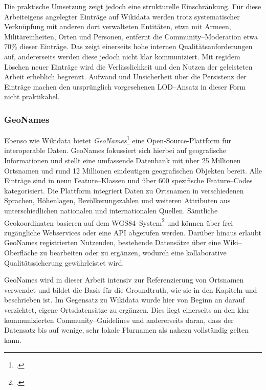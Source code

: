 \documentclass[12pt, a4paper, ngerman, bidi=default]{article}
\let\cite\footcite
\begin{document}
Die praktische Umsetzung zeigt jedoch eine strukturelle Einschränkung. Für diese Arbeiteigens angelegter Einträge auf Wikidata werden
trotz systematischer Verknüpfung mit anderen dort verwalteten Entitäten, etwa mit Armeen, Militäreinheiten, Orten und Personen, entfernt die Community–Moderation etwa 70\% dieser Einträge. 
Das zeigt einerseits hohe internen Qualitätsanforderungen auf, andererseits werden diese jedoch nicht klar kommuniziert. Mit regidem Löschen neuer Einträge wird die Verlässlichkeit und den Nutzen der 
geleisteten Arbeit erheblich begrenzt. 
Aufwand und Unsicherheit über die Persistenz der Einträge machen den ursprünglich vorgesehenen LOD–Ansatz in dieser Form nicht praktikabel.

\subsubsection{GeoNames}\label{subsubsec:geonames}

Ebenso wie Wikidata bietet \textit{GeoNames}\cite[vgl.][]{noauthor_geonames_nodate} eine Open-Source-Plattform für interoperable Daten. GeoNames fokussiert sich hierbei auf geografische Informationen 
und stellt eine umfassende Datenbank mit über 25 Millionen Ortsnamen und rund 12 Millionen eindeutigen geografischen Objekten bereit.  
Alle Einträge sind in neun Feature–Klassen und über 600 spezifische Feature–Codes kategorisiert. Die Plattform integriert Daten zu 
Ortsnamen in verschiedenen Sprachen, Höhenlagen, Bevölkerungszahlen und weiteren Attributen aus unterschiedlichen nationalen und internationalen Quellen.  
Sämtliche Geokoordinaten basieren auf dem WGS84–System\cite[\textit{WGS84: geodätische Grundlage des Global Positioning System (GPS)} ;vgl.][]{noauthor_wgs84_nodate}
und können über frei zugängliche Webservices oder eine API abgerufen werden.  
Darüber hinaus erlaubt GeoNames registrierten Nutzenden, bestehende Datensätze über eine Wiki–Oberfläche zu bearbeiten oder zu ergänzen, wodurch eine 
kollaborative Qualitätssicherung gewährleistet wird.

GeoNames wird in dieser Arbeit intensiv zur Referenzierung von Ortsnamen verwendet und bildet die Basis für die Groundtruth, wie sie in den Kapiteln  und 
 beschrieben ist. Im Gegensatz zu Wikidata wurde hier von Beginn an darauf verzichtet, eigene Ortsdatensätze zu ergänzen. Dies liegt einerseits an 
den klar kommunizierten Community–Guidelines und andererseits daran, dass der Datensatz bis auf wenige, sehr lokale Flurnamen als nahezu vollständig gelten kann.
\end{document}
